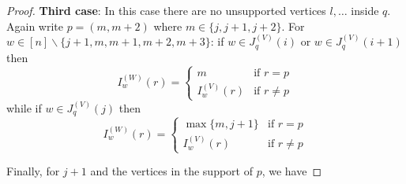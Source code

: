 \documentclass[11pt]{article}
\theoremstyle{remark}
\theoremstyle{definition}
\begin{document}
\begin{proof}
\textbf{Third case}: In this case there are no unsupported vertices $l, \ldots$ inside $q$.  Again write $p=(m, m+2)$ where $m\in \{j, j+1, j+2\}$. For $w \in [n]\backslash\{j+1,m,m+1,m+2,m+3\}$: if $w\in J_q^{(V)}(i)$ or $w\in J_q^{(V)}(i+1)$ then
    \[
    I_w^{(W)}(r) =  \begin{cases}
        m & \text{if } r=p \\
        I_{w}^{(V)}(r) & \text{if } r\neq p
      \end{cases} 
    \]
    while if $w\in J_q^{(V)}(j)$ then
    \[
    I_w^{(W)}(r) =  \begin{cases}
        \max\{m, j+1\} & \text{if } r=p \\
        I_{w}^{(V)}(r) & \text{if } r\neq p
      \end{cases} 
    \]

Finally, for $j+1$ and the vertices in the support of $p$, we have


\end{proof}
\end{document}
